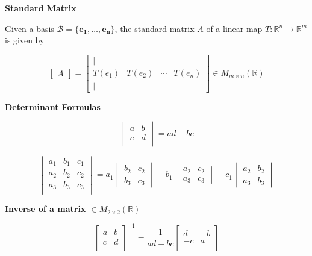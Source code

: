 \documentclass{article}
\newcommand{\R}{\mathbb{R}}
\begin{document}
\vspace{0.5cm}

\noindent \textbf{Standard Matrix}

Given a basis $\mathcal{B} = \{ \bm{e_1}, \ldots ,\bm{e_n} \} $, the standard matrix $A$ of a linear map $T: \R^n \to \R^m$ is given by 

$$\begin{bmatrix} A \end{bmatrix} = \begin{bmatrix}
| & | & & | \\
T(e_1) & T(e_2) & \cdots & T(e_n) \\
| & | & & |
\end{bmatrix} \in M_{m \times n} (\R)$$

\vspace{0.5cm}

\noindent \textbf{Determinant Formulas}

$$\begin{vmatrix}
a & b \\
c & d \\
\end{vmatrix}
= ad - bc $$

$$\begin{vmatrix}
a_1 & b_1 & c_1 \\
a_2 & b_2 & c_2 \\
a_3 & b_3 & c_3 \\
\end{vmatrix}
= a_1 \begin{vmatrix} b_2 & c_2 \\ b_3 & c_3 \end{vmatrix}
- b_1 \begin{vmatrix} a_2 & c_2 \\ a_3 & c_3 \end{vmatrix}
+ c_1 \begin{vmatrix} a_2 & b_2 \\ a_3 & b_3 \end{vmatrix}
$$

\vspace{0.5cm}

\noindent \textbf{Inverse of a matrix $\in M_{2 \times 2} (\R)$}

$$\begin{bmatrix}
a & b \\
c & d \\
\end{bmatrix}^{-1}
= \frac{1}{ad - bc}
\begin{bmatrix}
d & -b \\
-c & a \\
\end{bmatrix}
$$
\end{document}
